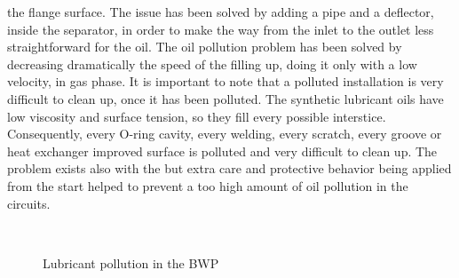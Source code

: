 the flange surface. The issue has been solved by adding a pipe and a
deflector, inside the separator, in order to make the way from the
inlet to the outlet less straightforward for the oil. The oil
pollution problem has been solved by decreasing dramatically the speed
of the filling up, doing it only with a low velocity, in gas phase. It
is important to note that a polluted installation is very difficult to
clean up, once it has been polluted. The synthetic lubricant oils have
low viscosity and surface tension, so they fill every possible
interstice. Consequently, every O-ring cavity, every welding, every
scratch, every groove or heat exchanger improved surface is polluted
and very difficult to clean up. The problem exists also with the
\AWP{} but extra care and protective behavior being applied from the
start helped to prevent a too high amount of oil pollution in the
circuits.

\begin{figure}
  \centering
  \begin{minipage}[r]{.49\linewidth}
    \begin{flushright}
    \end{flushright}
  \end{minipage} \hfill
  \begin{minipage}[l]{.49\linewidth}
    \begin{flushleft}
       \\
    \end{flushleft}
  \end{minipage}
  \caption{Lubricant pollution in the BWP}
  \label{fig:bwp-oil-pollution}
\end{figure}

